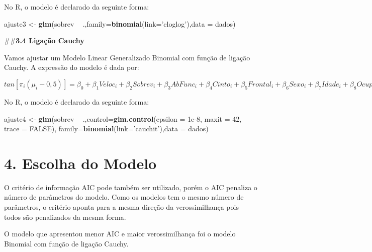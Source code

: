 \documentclass[]{article}
\newenvironment{Shaded}{\begin{snugshade}}{\end{snugshade}}
\newcommand{\KeywordTok}[1]{\textcolor[rgb]{0.13,0.29,0.53}{\textbf{#1}}}
\newcommand{\DataTypeTok}[1]{\textcolor[rgb]{0.13,0.29,0.53}{#1}}
\newcommand{\DecValTok}[1]{\textcolor[rgb]{0.00,0.00,0.81}{#1}}
\newcommand{\FloatTok}[1]{\textcolor[rgb]{0.00,0.00,0.81}{#1}}
\newcommand{\StringTok}[1]{\textcolor[rgb]{0.31,0.60,0.02}{#1}}
\newcommand{\OtherTok}[1]{\textcolor[rgb]{0.56,0.35,0.01}{#1}}
\newcommand{\OperatorTok}[1]{\textcolor[rgb]{0.81,0.36,0.00}{\textbf{#1}}}
\newcommand{\NormalTok}[1]{#1}
\begin{document}
No R, o modelo é declarado da seguinte forma:

\begin{Shaded}
\begin{Highlighting}[]
\NormalTok{ajuste3 <-}\StringTok{ }\KeywordTok{glm}\NormalTok{(sobrev }\OperatorTok{~}\StringTok{ }\NormalTok{.,}\DataTypeTok{family=}\KeywordTok{binomial}\NormalTok{(}\DataTypeTok{link=}\StringTok{'cloglog'}\NormalTok{),}\DataTypeTok{data =}\NormalTok{ dados)}
\end{Highlighting}
\end{Shaded}

\#\#\textbf{3.4 Ligação Cauchy}

Vamos ajustar um Modelo Linear Generalizado Binomial com função de
ligação Cauchy. A expressão do modelo é dada por:

\(tan[\pi_i(\mu_i- 0,5)] = \beta_0 + \beta_1 Veloc_i + \beta_2 Sobrev_i + \beta_3 AbFunc_i + \beta_4 Cinto_i + \beta_5 Frontal_i + \beta_6 Sexo_i + \beta_7 Idade_i + \beta_8 Ocupantes_i + \beta_9 Grav_i\)

No R, o modelo é declarado da seguinte forma:

\begin{Shaded}
\begin{Highlighting}[]
\NormalTok{ajuste4 <-}\StringTok{ }\KeywordTok{glm}\NormalTok{(sobrev }\OperatorTok{~}\StringTok{ }\NormalTok{.,}\DataTypeTok{control=}\KeywordTok{glm.control}\NormalTok{(}\DataTypeTok{epsilon =} \FloatTok{1e-8}\NormalTok{, }\DataTypeTok{maxit =} \DecValTok{42}\NormalTok{, }
                                           \DataTypeTok{trace =} \OtherTok{FALSE}\NormalTok{), }\DataTypeTok{family=}\KeywordTok{binomial}\NormalTok{(}\DataTypeTok{link=}\StringTok{'cauchit'}\NormalTok{),}\DataTypeTok{data =}\NormalTok{ dados)}
\end{Highlighting}
\end{Shaded}

\hypertarget{escolha-do-modelo}{%
\section{4. Escolha do Modelo}\label{escolha-do-modelo}}

O critério de informação AIC pode também ser utilizado, porém o AIC
penaliza o número de parâmetros do modelo. Como os modelos tem o mesmo
número de parâmetros, o critério aponta para a mesma direção da
verossimilhança pois todos são penalizados da mesma forma.

O modelo que apresentou menor AIC e maior verossimilhança foi o modelo
Binomial com função de ligação Cauchy.
\end{document}
